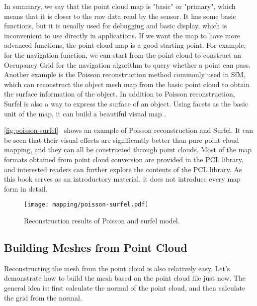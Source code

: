In summary, we say that the point cloud map is "basic" or "primary", which means that it is closer to the raw data read by the sensor. It has some basic functions, but it is usually used for debugging and basic display, which is inconvenient to use directly in applications. If we want the map to have more advanced functions, the point cloud map is a good starting point. For example, for the navigation function, we can start from the point cloud to construct an Occupancy Grid for the navigation algorithm to query whether a point can pass. Another example is the Poisson reconstruction {\cite{Kazhdan2006}} method commonly used in SfM, which can reconstruct the object mesh map from the basic point cloud to obtain the surface information of the object. In addition to Poisson reconstruction, Surfel is also a way to express the surface of an object. Using facets as the basic unit of the map, it can build a beautiful visual map {\cite{Stuckler2014}}.

\autoref{fig:poisson-surfel}~ shows an example of Poisson reconstruction and Surfel. It can be seen that their visual effects are significantly better than pure point cloud mapping, and they can all be constructed through point clouds. Most of the map formats obtained from point cloud conversion are provided in the PCL library, and interested readers can further explore the contents of the PCL library. As this book serves as an introductory material, it does not introduce every map form in detail.

\begin{figure}[!htp]
	\centering
	\texttt{[image: mapping/poisson-surfel.pdf]}
	\caption{Reconstruction results of Poisson and surfel model. }
	\label{fig:poisson-surfel}
\end{figure}

\subsection{Building Meshes from Point Cloud}
Reconstructing the mesh from the point cloud is also relatively easy. Let's demonstrate how to build the mesh based on the point cloud file just now. The general idea is: first calculate the normal of the point cloud, and then calculate the grid from the normal.

